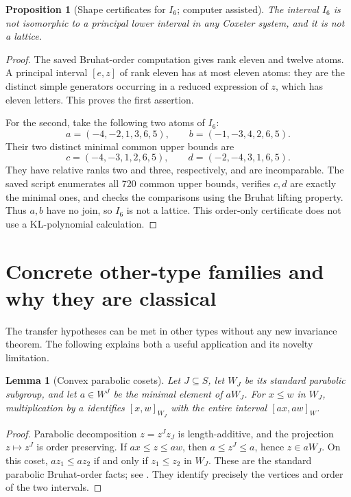 \documentclass[11pt]{article}
\newtheorem{proposition}[theorem]{Proposition}
\newtheorem{lemma}[theorem]{Lemma}
\theoremstyle{definition}\newtheorem{definition}[theorem]{Definition}
\theoremstyle{remark}\newtheorem{remark}[theorem]{Remark}
\begin{document}
\begin{proposition}[Shape certificates for $I_6$; computer assisted]
The interval $I_6$ is not isomorphic to a principal lower interval
in any Coxeter system, and it is not a lattice.
\end{proposition}
\begin{proof}
The saved Bruhat-order computation gives rank eleven and twelve
atoms. A principal interval $[e,z]$ of rank eleven has at most eleven
atoms: they are the distinct simple generators occurring in a
reduced expression of $z$, which has eleven letters.
This proves the first assertion.

For the second, take the following two atoms of $I_6$:
\[
 a=(-4,-2,1,3,6,5),\qquad b=(-1,-3,4,2,6,5).
\]
Their two distinct minimal common upper bounds are
\[
 c=(-4,-3,1,2,6,5),\qquad d=(-2,-4,3,1,6,5).
\]
They have relative ranks two and three, respectively, and are
incomparable. The saved script enumerates all 720 common upper
bounds, verifies $c,d$ are exactly the minimal ones, and checks
the comparisons using the Bruhat lifting property. Thus $a,b$
have no join, so $I_6$ is not a lattice. This order-only certificate
does not use a KL-polynomial calculation.
\end{proof}

\section{Concrete other-type families and why they are classical}
The transfer hypotheses can be met in other types without any
new invariance theorem. The following explains both a useful application
and its novelty limitation.

\begin{lemma}[Convex parabolic cosets]\label{lem:coset}
Let $J\subseteq S$, let $W_J$ be its standard parabolic subgroup, and
let $a\in W^J$ be the minimal element of $aW_J$.
For $x\leq w$ in $W_J$, multiplication by $a$ identifies
$[x,w]_{W_J}$ with the entire interval $[ax,aw]_W$.
\end{lemma}
\begin{proof}
Parabolic decomposition $z=z^Jz_J$ is length-additive, and the
projection $z\mapsto z^J$ is order preserving. If $ax\leq z\leq aw$,
then $a\leq z^J\leq a$, hence $z\in aW_J$.
On this coset, $az_1\leq az_2$ if and only if $z_1\leq z_2$ in $W_J$.
These are the standard parabolic Bruhat-order facts; see
\cite[Section 2.5]{bb}. They identify precisely the vertices and order
of the two intervals.
\end{proof}
\end{document}
